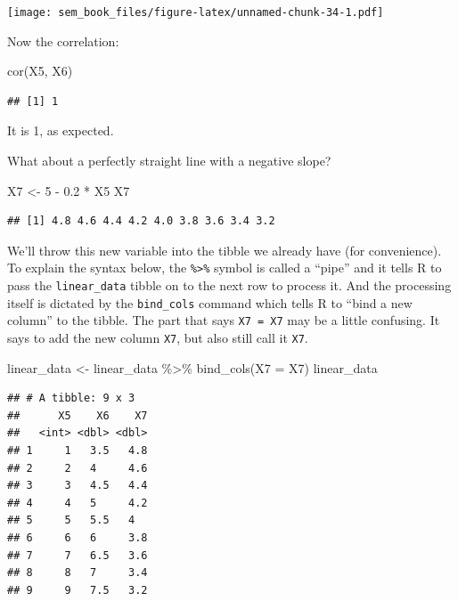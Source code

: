 \documentclass[
]{book}
\newenvironment{Shaded}{\begin{snugshade}}{\end{snugshade}}
\newcommand{\AttributeTok}[1]{\textcolor[rgb]{0.77,0.63,0.00}{#1}}
\newcommand{\DecValTok}[1]{\textcolor[rgb]{0.00,0.00,0.81}{#1}}
\newcommand{\FloatTok}[1]{\textcolor[rgb]{0.00,0.00,0.81}{#1}}
\newcommand{\FunctionTok}[1]{\textcolor[rgb]{0.00,0.00,0.00}{#1}}
\newcommand{\NormalTok}[1]{#1}
\newcommand{\OtherTok}[1]{\textcolor[rgb]{0.56,0.35,0.01}{#1}}
\newcommand{\SpecialCharTok}[1]{\textcolor[rgb]{0.00,0.00,0.00}{#1}}
\begin{document}
\texttt{[image: sem\_book\_files/figure-latex/unnamed-chunk-34-1.pdf]}

Now the correlation:

\begin{Shaded}
\begin{Highlighting}[]
\FunctionTok{cor}\NormalTok{(X5, X6)}
\end{Highlighting}
\end{Shaded}

\begin{verbatim}
## [1] 1
\end{verbatim}

It is 1, as expected.

What about a perfectly straight line with a negative slope?

\begin{Shaded}
\begin{Highlighting}[]
\NormalTok{X7 }\OtherTok{\textless{}{-}} \DecValTok{5} \SpecialCharTok{{-}} \FloatTok{0.2} \SpecialCharTok{*}\NormalTok{ X5}
\NormalTok{X7}
\end{Highlighting}
\end{Shaded}

\begin{verbatim}
## [1] 4.8 4.6 4.4 4.2 4.0 3.8 3.6 3.4 3.2
\end{verbatim}

We'll throw this new variable into the tibble we already have (for convenience). To explain the syntax below, the \texttt{\%\textgreater{}\%} symbol is called a ``pipe'' and it tells R to pass the \texttt{linear\_data} tibble on to the next row to process it. And the processing itself is dictated by the \texttt{bind\_cols} command which tells R to ``bind a new column'' to the tibble. The part that says \texttt{X7\ =\ X7} may be a little confusing. It says to add the new column \texttt{X7}, but also still call it \texttt{X7}.

\begin{Shaded}
\begin{Highlighting}[]
\NormalTok{linear\_data }\OtherTok{\textless{}{-}}\NormalTok{ linear\_data }\SpecialCharTok{\%\textgreater{}\%}
    \FunctionTok{bind\_cols}\NormalTok{(}\AttributeTok{X7 =}\NormalTok{ X7)}
\NormalTok{linear\_data}
\end{Highlighting}
\end{Shaded}

\begin{verbatim}
## # A tibble: 9 x 3
##      X5    X6    X7
##   <int> <dbl> <dbl>
## 1     1   3.5   4.8
## 2     2   4     4.6
## 3     3   4.5   4.4
## 4     4   5     4.2
## 5     5   5.5   4  
## 6     6   6     3.8
## 7     7   6.5   3.6
## 8     8   7     3.4
## 9     9   7.5   3.2
\end{verbatim}
\end{document}
